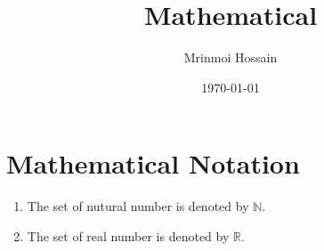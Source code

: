 \documentclass[11pt]{article}
\begin{document}
\title{Mathematical}
\author{Mrinmoi Hossain}
\date{\today}
\maketitle

\section{Mathematical Notation}
\begin{enumerate}
\item The set of nutural number is denoted by $\mathbb{N}$.
\item The set of real number is denoted by $\mathbb{R}$.
\end{enumerate}
\end{document}
